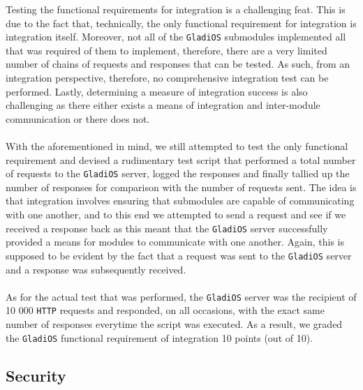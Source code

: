 \documentclass[12pt,a4paper,titlepage]{article}
\begin{document}
Testing the functional requirements for integration is a challenging feat. This
is due to the fact that, technically, the only functional requirement for
integration is integration itself. Moreover, not all of the \texttt{GladiOS} submodules
implemented all that was required of them to implement, therefore, there are a
very limited number of chains of requests and responses that can be tested. As
such, from an integration perspective, therefore, no comprehensive integration
test can be performed. Lastly, determining a measure of integration success is
also challenging as there either exists a means of integration and inter-module
communication or there does not.
\\\\
With the aforementioned in mind, we still attempted to test the only functional
requirement and devised a rudimentary test script that performed a total number
of requests to the \texttt{GladiOS} server, logged the responses and finally tallied up
the number of responses for comparison with the number of requests sent. The
idea is that integration involves ensuring that submodules are capable of
communicating with one another, and to this end we attempted to send a request
and see if we received a response back as this meant that the \texttt{GladiOS} server
successfully provided a means for modules to communicate with one another.
Again, this is supposed to be evident by the fact that a request was sent to
the \texttt{GladiOS} server and a response was subsequently received.
\\\\
As for the actual test that was performed, the \texttt{GladiOS} server was the recipient
of 10 000 \texttt{HTTP} requests and responded, on all occasions, with the exact same
number of responses everytime the script was executed. As a result, we graded
the \texttt{GladiOS} functional requirement of integration 10 points (out of 10).

\subsection{Security}
\end{document}
